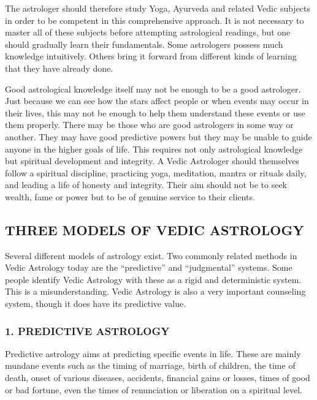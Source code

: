  

The astrologer should therefore study Yoga, Ayurveda and related Vedic subjects in order to be competent in this comprehensive approach. It is not necessary to master all of these subjects before attempting astrological readings, but one should gradually learn their fundamentals. Some astrologers possess much knowledge intuitively. Others bring it forward from different kinds of learning that they have already done.

 

Good astrological knowledge itself may not be enough to be a good astrologer. Just because we can see how the stars affect people or when events may occur in their lives, this may not be enough to help them understand these events or use them properly. There may be those who are good astrologers in some way or another. They may have good predictive powers but they may be unable to guide anyone in the higher goals of life. This requires not only astrological knowledge but spiritual development and integrity. A Vedic Astrologer should themselves follow a spiritual discipline, practicing yoga, meditation, mantra or rituals daily, and leading a life of honesty and integrity.  Their aim should not be to seek wealth, fame or power but to be of genuine service to their clients.

 

\subsection{THREE MODELS OF VEDIC ASTROLOGY}
 

Several different models of astrology exist. Two commonly related methods in Vedic Astrology today are the “predictive” and “judgmental” systems. Some people identify Vedic Astrology with these as a rigid and deterministic system. This is a misunderstanding. Vedic Astrology is also a very important counseling system, though it does have its predictive value.

 

\subsubsection{1. PREDICTIVE ASTROLOGY}
 

Predictive astrology aims at predicting specific events in life. These are mainly mundane events such as the timing of marriage, birth of children, the time of death, onset of various diseases, accidents, financial gains or losses, times of good or bad fortune, even the times of renunciation or liberation on a spiritual level.

